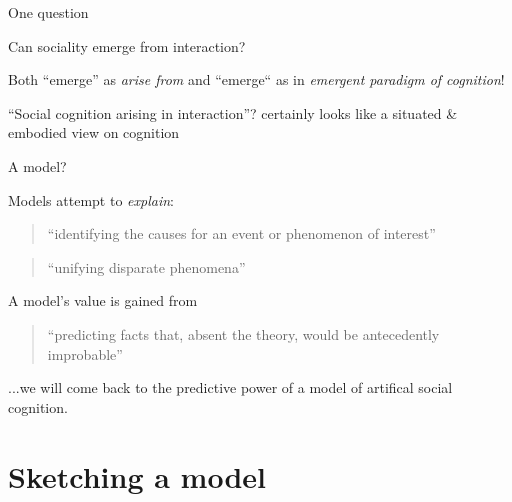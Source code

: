 \documentclass[xcolor=table]{beamer}
\begin{document}
\begin{frame}{One question}

    \Large
    \centering

    Can sociality emerge from interaction?

    \pause
    \normalsize
    \vspace{2em}

    Both ``emerge'' as \emph{arise from} and ``emerge`` as in \emph{emergent paradigm of
    cognition}!

    \pause

    ``Social cognition arising in interaction''? certainly looks like a situated \&
    embodied view on cognition

\end{frame}


{
\begin{frame}{A model?}

    Models attempt to \emph{explain}: 
    \begin{quote}
        ``identifying the causes for an event or phenomenon of interest''
    \end{quote}
    \begin{quote}
        ``unifying disparate phenomena''
    \end{quote}

        A model's value is gained from
    \begin{quote}
        ``predicting facts that, absent the theory, would be antecedently
        improbable''
    \end{quote}

    \pause

    ...we will come back to the predictive power of a model of artifical social
    cognition.

\end{frame}
}




\section{Sketching a model}

\end{document}
